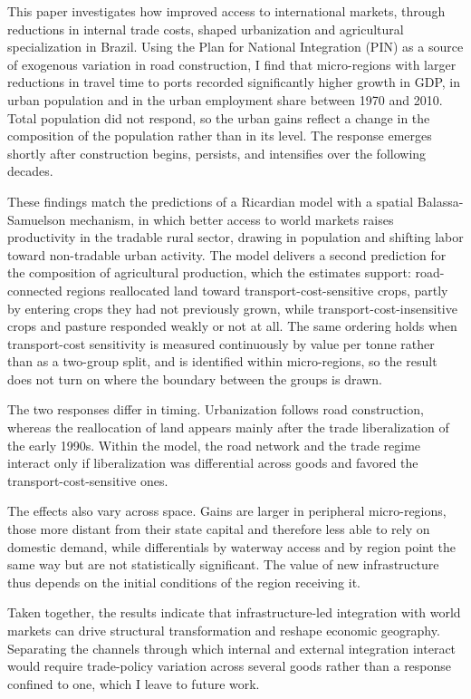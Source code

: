 \documentclass[11pt]{article}
\begin{document}
This paper investigates how improved access to international markets, through reductions in internal trade costs, shaped urbanization and agricultural specialization in Brazil. Using the Plan for National Integration (PIN) as a source of exogenous variation in road construction, I find that micro-regions with larger reductions in travel time to ports recorded significantly higher growth in GDP, in urban population and in the urban employment share between 1970 and 2010. Total population did not respond, so the urban gains reflect a change in the composition of the population rather than in its level. The response emerges shortly after construction begins, persists, and intensifies over the following decades.

These findings match the predictions of a Ricardian model with a spatial Balassa-Samuelson mechanism, in which better access to world markets raises productivity in the tradable rural sector, drawing in population and shifting labor toward non-tradable urban activity. The model delivers a second prediction for the composition of agricultural production, which the estimates support: road-connected regions reallocated land toward transport-cost-sensitive crops, partly by entering crops they had not previously grown, while transport-cost-insensitive crops and pasture responded weakly or not at all. The same ordering holds when transport-cost sensitivity is measured continuously by value per tonne rather than as a two-group split, and is identified within micro-regions, so the result does not turn on where the boundary between the groups is drawn.

The two responses differ in timing. Urbanization follows road construction, whereas the reallocation of land appears mainly after the trade liberalization of the early 1990s. Within the model, the road network and the trade regime interact only if liberalization was differential across goods and favored the transport-cost-sensitive ones.

The effects also vary across space. Gains are larger in peripheral micro-regions, those more distant from their state capital and therefore less able to rely on domestic demand, while differentials by waterway access and by region point the same way but are not statistically significant. The value of new infrastructure thus depends on the initial conditions of the region receiving it.

Taken together, the results indicate that infrastructure-led integration with world markets can drive structural transformation and reshape economic geography. Separating the channels through which internal and external integration interact would require trade-policy variation across several goods rather than a response confined to one, which I leave to future work.
\end{document}
